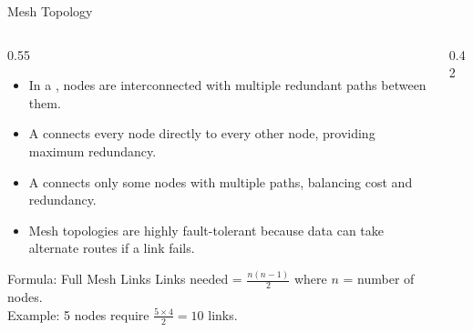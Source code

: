 \documentclass[aspectratio=169]{beamer}  %
\begin{document}
\begin{frame}{Mesh Topology}
    \begin{columns}[T]
        \begin{column}{0.55\textwidth}
            \begin{itemize}
                \item In a , nodes are interconnected with multiple redundant paths between them.
                \item A  connects every node directly to every other node, providing maximum redundancy.
                \item A  connects only some nodes with multiple paths, balancing cost and redundancy.
                \item Mesh topologies are highly fault-tolerant because data can take alternate routes if a link fails.
            \end{itemize}
            
            \vspace{0.3em}
            \begin{alertblock}{Formula: Full Mesh Links}
                \scriptsize
                Links needed = $\frac{n(n-1)}{2}$ where $n$ = number of nodes. \\
                Example: 5 nodes require $\frac{5 \times 4}{2} = 10$ links.
            \end{alertblock}
        \end{column}
        \begin{column}{0.42\textwidth}
            \begin{center}
\end{center}
\end{column}
\end{columns}
\end{frame}
\end{document}
